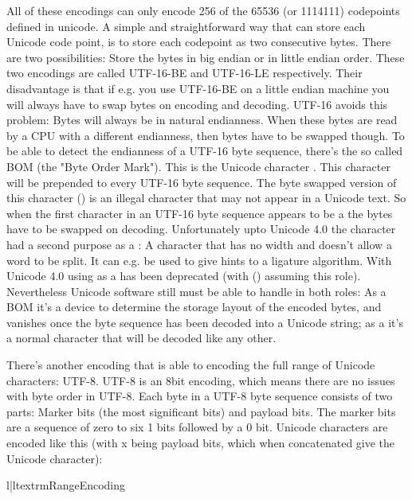 All of these encodings can only encode 256 of the 65536 (or 1114111)
codepoints defined in unicode. A simple and straightforward way that
can store each Unicode code point, is to store each codepoint as two
consecutive bytes. There are two possibilities: Store the bytes in big
endian or in little endian order. These two encodings are called
UTF-16-BE and UTF-16-LE respectively. Their disadvantage is that if
e.g. you use UTF-16-BE on a little endian machine you will always have
to swap bytes on encoding and decoding. UTF-16 avoids this problem:
Bytes will always be in natural endianness. When these bytes are read
by a CPU with a different endianness, then bytes have to be swapped
though. To be able to detect the endianness of a UTF-16 byte sequence,
there's the so called BOM (the "Byte Order Mark"). This is the Unicode
character . This character will be prepended to every UTF-16
byte sequence. The byte swapped version of this character () is
an illegal character that may not appear in a Unicode text. So when
the first character in an UTF-16 byte sequence appears to be a 
the bytes have to be swapped on decoding. Unfortunately upto Unicode
4.0 the character  had a second purpose as a : A character that has no width and doesn't allow a
word to be split. It can e.g. be used to give hints to a ligature
algorithm. With Unicode 4.0 using  as a  has been deprecated (with  () assuming
this role). Nevertheless Unicode software still must be able to handle
 in both roles: As a BOM it's a device to determine the storage
layout of the encoded bytes, and vanishes once the byte sequence has
been decoded into a Unicode string; as a 
it's a normal character that will be decoded like any other.

There's another encoding that is able to encoding the full range of
Unicode characters: UTF-8. UTF-8 is an 8bit encoding, which means
there are no issues with byte order in UTF-8. Each byte in a UTF-8
byte sequence consists of two parts: Marker bits (the most significant
bits) and payload bits. The marker bits are a sequence of zero to six
1 bits followed by a 0 bit. Unicode characters are encoded like this
(with x being payload bits, which when concatenated give the Unicode
character):

\begin{tableii}{l|l}{textrm}{}{Range}{Encoding}
\end{tableii}

